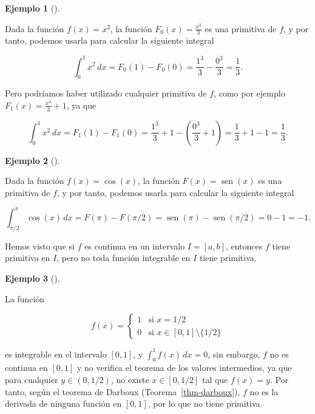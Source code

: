 \documentclass[
  a4paper,
]{scrreport}
\theoremstyle{plain}
\theoremstyle{definition}
\theoremstyle{plain}
\theoremstyle{plain}
\theoremstyle{definition}
\newtheorem{example}{Ejemplo}[chapter]
\theoremstyle{definition}
\theoremstyle{remark}
\begin{document}
\begin{example}[]\protect\hypertarget{exm-regla-barrow}{}\label{exm-regla-barrow}

Dada la función \(f(x)=x^2\), la función \(F_0(x)= \frac{x^3}{3}\) es
una primitiva de \(f\), y por tanto, podemos usarla para calcular la
siguiente integral

\[
\int_0^1 x^2\, dx = F_0(1)-F_0(0) = \frac{1^3}{3}-\frac{0^3}{3} = \frac{1}{3}.
\]

Pero podríamos haber utilizado cualquier primitiva de \(f\), como por
ejemplo \(F_1(x) = \frac{x^3}{3}+1\), ya que

\[
\int_0^1 x^2\, dx = F_1(1)-F_1(0) = \frac{1^3}{3}+1-\left(\frac{0^3}{3}+1\right) = \frac{1}{3}+1-1 = \frac{1}{3}.
\]

\end{example}

\begin{example}[]\protect\hypertarget{exm-regla-barrow-2}{}\label{exm-regla-barrow-2}

Dada la función \(f(x)=\cos(x)\), la función
\(F(x)= \operatorname{sen}(x)\) es una primitiva de \(f\), y por tanto,
podemos usarla para calcular la siguiente integral

\[
\int_{\pi/2}^\pi \cos(x)\, dx = F(\pi)-F(\pi/2) = \operatorname{sen}(\pi)-\operatorname{sen}(\pi/2) = 0-1 = -1.
\]

\end{example}

Hemos visto que si \(f\) es continua en un intervalo \(I=[a,b]\),
entonces \(f\) tiene primitiva en \(I\), pero no toda función integrable
en \(I\) tiene primitiva.

\begin{example}[]\protect\hypertarget{exm-funcion-integrable-sin-primitiva}{}\label{exm-funcion-integrable-sin-primitiva}

La función

\[
f(x) = 
\begin{cases}
1 & \mbox{si $x=1/2$}\\
0 & \mbox{si $x\in [0,1]\setminus\{1/2\}$}
\end{cases}
\]

es integrable en el intervalo \([0,1]\), y \(\int_0^1 f(x)\,dx = 0\),
sin embargo, \(f\) no es continua en \([0,1]\) y no verifica el teorema
de los valores intermedios, ya que para cualquier \(y\in(0,1/2)\), no
existe \(x\in[0,1/2]\) tal que \(f(x)=y\). Por tanto, según el teorema
de Darboux (Teorema~\ref{thm-darboux}), \(f\) no es la derivada de
ninguna función en \([0,1]\), por lo que no tiene primitiva.

\end{example}
\end{document}

